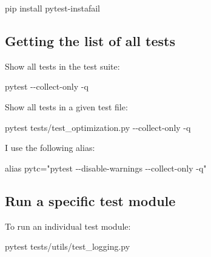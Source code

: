 \documentclass[
]{report}
\newenvironment{Shaded}{\begin{snugshade}}{\end{snugshade}}
\newcommand{\AttributeTok}[1]{\textcolor[rgb]{0.40,0.45,0.13}{#1}}
\newcommand{\BuiltInTok}[1]{\textcolor[rgb]{0.00,0.23,0.31}{#1}}
\newcommand{\ExtensionTok}[1]{\textcolor[rgb]{0.00,0.23,0.31}{#1}}
\newcommand{\NormalTok}[1]{\textcolor[rgb]{0.00,0.23,0.31}{#1}}
\newcommand{\StringTok}[1]{\textcolor[rgb]{0.13,0.47,0.30}{#1}}
\begin{document}
\begin{Shaded}
\begin{Highlighting}[]
\ExtensionTok{pip}\NormalTok{ install pytest{-}instafail}
\end{Highlighting}
\end{Shaded}

\subsection{Getting the list of all
tests}\label{getting-the-list-of-all-tests}

Show all tests in the test suite:

\begin{Shaded}
\begin{Highlighting}[]
\ExtensionTok{pytest} \AttributeTok{{-}{-}collect{-}only} \AttributeTok{{-}q}
\end{Highlighting}
\end{Shaded}

Show all tests in a given test file:

\begin{Shaded}
\begin{Highlighting}[]
\ExtensionTok{pytest}\NormalTok{ tests/test\_optimization.py }\AttributeTok{{-}{-}collect{-}only} \AttributeTok{{-}q}
\end{Highlighting}
\end{Shaded}

I use the following alias:

\begin{Shaded}
\begin{Highlighting}[]
\BuiltInTok{alias}\NormalTok{ pytc=}\StringTok{"pytest {-}{-}disable{-}warnings {-}{-}collect{-}only {-}q"}
\end{Highlighting}
\end{Shaded}

\subsection{Run a specific test
module}\label{run-a-specific-test-module}

To run an individual test module:

\begin{Shaded}
\begin{Highlighting}[]
\ExtensionTok{pytest}\NormalTok{ tests/utils/test\_logging.py}
\end{Highlighting}
\end{Shaded}
\end{document}
